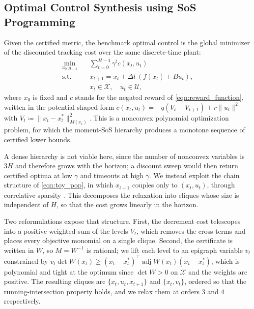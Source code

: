 \documentclass[lettersize,journal]{IEEEtran}
\begin{document}
\subsection{Optimal Control Synthesis using SoS Programming}
Given the certified metric, the benchmark optimal control is the global minimizer 
of the discounted tracking cost over the same discrete-time plant:
\begin{equation}\label{eqn:toy_pop}
    \begin{aligned}
        \min_{u_{0:H-1}} \quad & \textstyle\sum_{t=0}^{H-1} \gamma^t c(x_t, u_t) \\
        \text{s.t.} \quad & x_{t+1} = x_t + \Delta t \, (f(x_t) + B u_t), \\
        & x_t \in \mathcal{X}, \quad u_t \in \mathcal{U},
    \end{aligned}
\end{equation}
where $x_0$ is fixed and $c$ stands for the negated reward of \eqref{eqn:reward_function}, 
written in the potential-shaped form $c(x_t, u_t) = -q (V_t - V_{t+1}) + r \|u_t\|^2$ 
with $V_t \coloneq \|x_t - x^*_t\|_{M(x_t)}^2$. 
This is a nonconvex polynomial optimization problem, 
for which the moment-SoS hierarchy \cite{lasserre2001global} produces a monotone sequence of certified lower bounds.

A dense hierarchy is not viable here, since the number of nonconvex variables is $3H$ and therefore grows with the horizon; 
a discount sweep would then return certified optima at low $\gamma$ and timeouts at high $\gamma$. 
We instead exploit the chain structure of \eqref{eqn:toy_pop}, in which $x_{t+1}$ couples only to $(x_t, u_t)$, 
through correlative sparsity \cite{waki2006sums, lasserre2006convergent}. 
This decomposes the relaxation into cliques whose size is independent of $H$, 
so that the cost grows linearly in the horizon.

Two reformulations expose that structure. 
First, the decrement cost telescopes into a positive weighted sum of the levels $V_t$, 
which removes the cross terms and places every objective monomial on a single clique. 
Second, the certificate is written in $W$, so $M = W^{-1}$ is rational; 
we lift each level to an epigraph variable $v_t$ constrained by 
$v_t \det W(x_t) \ge (x_t - x^*_t)^\top \operatorname{adj} W(x_t) (x_t - x^*_t)$, 
which is polynomial and tight at the optimum since $\det W > 0$ on $\mathcal{X}$ and the weights are positive. 
The resulting cliques are $\{x_t, u_t, x_{t+1}\}$ and $\{x_t, v_t\}$, 
ordered so that the running-intersection property holds, 
and we relax them at orders $3$ and $4$ respectively.
\end{document}
